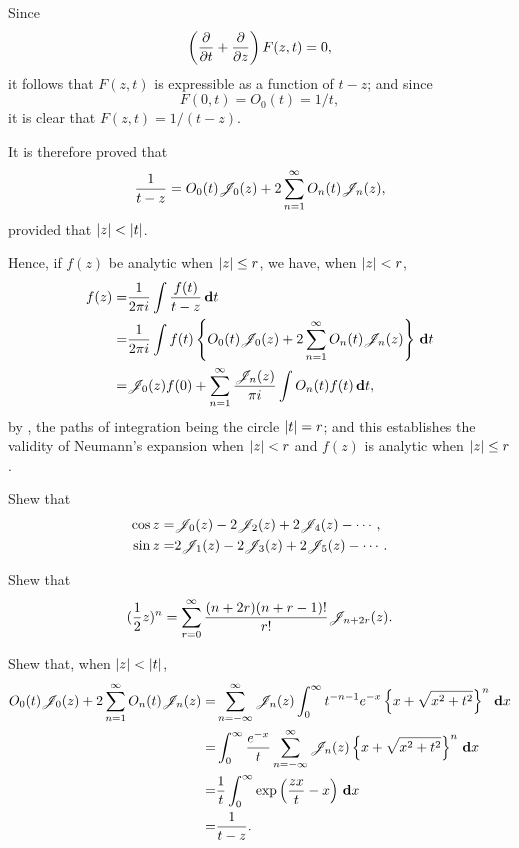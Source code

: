Since
$$
\left(  \frac{\partial}{\partial t} + \frac{\partial}{\partial z}
 \right)
F(z,t)
=
0,
$$
it follows that $F(z,t)$ is expressible as a function of $t-z$; and
since
$$
F(0,t) = O_{0}(t) = 1/t,
$$
it is clear that $F(z,t) = 1/(t-z)$.

It is therefore proved that
$$
\frac{1}{t-z}
=
O_{0}(t) \mathscr{J}_{0}(z)
+ 2 \sum_{n=1}^{\infty}
O_{n}(t) \mathscr{J}_{n}(z),
$$
provided that $\left| z \right| < \left| t \right|$.

Hence, if $f(z)$ be analytic when $\left| z \right| \leq r$, we have, when
$\left| z \right| < r$,
\begin{align*}
  f(z)
  =&
  \frac{1}{2\pi i} \int \frac{f(t)}{t-z} \, \mathbf{d} t
  \\
  =&
  \frac{1}{2\pi i}
  \int f(t)
  \left\{ 
    O_{0}(t) \mathscr{J}_{0}(z) + 2 \sum_{n=1}^{\infty} O_{n}(t) \mathscr{J}_{n}(z)
   \right\}
  \, \mathbf{d} t
  \\
  =&
  \mathscr{J}_{0}(z) f(0)
  +
  \sum_{n=1}^{\infty} \frac{\mathscr{J}_{n}(z)}{\pi i}
  \int O_{n}(t)f(t) \, \mathbf{d} t,
\end{align*}
by , the paths of integration being the circle
$\left| t \right|=r$; and this establishes the validity of Neumann's
expansion when $\left| z \right| < r$ and $f(z)$ is analytic when
$\left| z \right|\leq r$.

% 
%
\begin{wandwexample}
  Shew that
  \begin{align*}
    \cos z =& \mathscr{J}_{0}(z) - 2\mathscr{J}_{2}(z) + 2\mathscr{J}_{4}(z) - \cdots, \\
    \sin z =& 2\mathscr{J}_{1}(z) - 2\mathscr{J}_{3}(z) + 2\mathscr{J}_{5}(z) - \cdots.
  \end{align*}
\end{wandwexample}
\begin{wandwexample}
  Shew that
  $$
  (\frac{1}{2} z)^{n}
  =
  \sum_{r=0}^{\infty}
  \frac{(n+2r)(n+r-1)!}{r!}
  \mathscr{J}_{n+2r}(z).
  $$
\end{wandwexample}
\begin{wandwexample}
  Shew that, when $\left| z \right|<\left| t \right|$,
  \begin{align*}
    O_{0}(t) \mathscr{J}_{0}(z)
    +
    2 \sum_{n=1}^{\infty} O_{n}(t) \mathscr{J}_{n}(z)
    =&
    \sum_{n=-\infty}^{\infty}
    \mathscr{J}_{n}(z)
    \int_{0}^{\infty}
    t^{-n-1}
    e^{-x}
    \left\{ 
      x + \sqrt{x^{2} + t^{2}}
     \right\}^{n}
    \, \mathbf{d} x
    \\
    =&
    \int_{0}^{\infty}
    \frac{e^{-x}}{t}
    \sum_{n=-\infty}^{\infty}
    \mathscr{J}_{n}(z)
    \left\{ 
      x + \sqrt{x^{2} + t^{2}}
     \right\}^{n}
    \, \mathbf{d} x
    \\
    =&
    \frac{1}{t}
    \int_{0}^{\infty} \exp \left(  \frac{zx}{t} - x  \right) \, \mathbf{d} x
    \\
    =&
    \frac{1}{t-z}.
  \end{align*}
\end{wandwexample}

